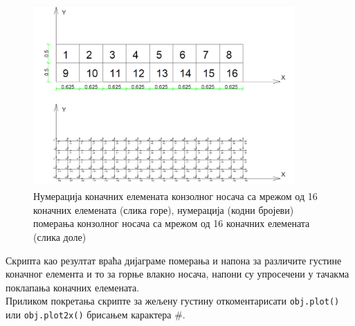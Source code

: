 \documentclass[11pt, a4paper]{article}
\begin{document}
\begin{figure}[H]
\centering
\includegraphics[width=10cm, height=7cm]{Slike/Gusca.png}
\caption{Нумерација коначних елемената конзолног носача са мрежом од 16 коначних елемената (слика горе), нумерација (кодни бројеви) померања конзолног носача са мрежом од 16 коначних елемената (слика доле)}
\end{figure}
Скрипта као резултат враћа дијаграме померања и напона за различите густине коначног елемента и то за горње влакно носача, напони су упросечени у тачакма поклапања коначних елемената. \\
Приликом покретања скрипте за жељену густину откоментарисати \texttt{obj.plot()} или \texttt{obj.plot2x()} брисањем карактера $\#$.
\end{document}
